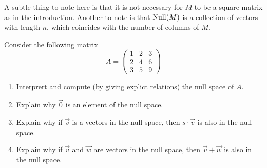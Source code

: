 \documentclass{ximera}
\begin{document}
\begin{remark}
  A subtle thing to note here is that it is not necessary for $M$ to be
  a square matrix as in the introduction. Another to note is that
  $\operatorname{Null}(M)$ is a collection of vectors with length $n$, which coincides
  with the number of columns of $M$.
\end{remark}


\begin{example}
Consider the following matrix
  \[
    A = \begin{pmatrix}
      1 & 2 & 3 \\
      2 & 4 & 6 \\
      3 & 5 & 9
    \end{pmatrix}
  \]
  \begin{enumerate}
\item Interprert and compute (by giving explict relations) the null space of $A$.
\item Explain why $\vec{0}$ is an element of the null space.
\item Explain why if $\vec{v}$ is a vectors in the null space, then $s\cdot \vec{v}$ is also in the null space.
\item Explain why if $\vec{v}$ and $\vec{w}$ are vectors in the null space, then $\vec{v} + \vec{w}$ is also in the null space.
  \end{enumerate} 
\begin{explanation}
\end{explanation}
\end{example}
\end{document}
